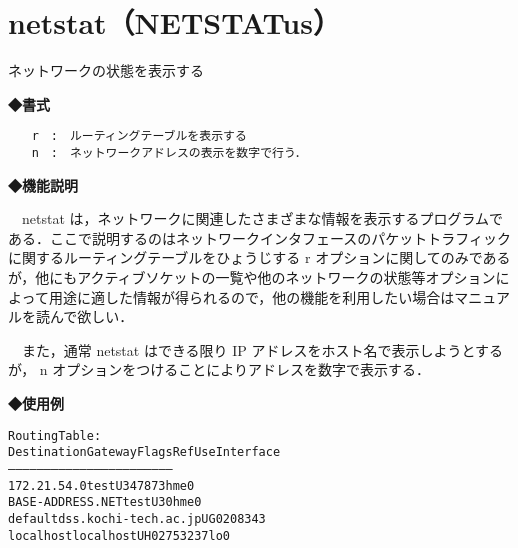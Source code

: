 \label{cmd:netstat}
\section{netstat（NETSTATus）}
ネットワークの状態を表示する\par

{\bf ◆書式}
\begin{center}
\begin{screen}
\begin{alltt}
 % netstat [-rn]
 　　r　:　ルーティングテーブルを表示する
 　　n　:　ネットワークアドレスの表示を数字で行う．
\end{alltt}
\end{screen}
\end{center}

{\bf ◆機能説明}

　netstat は，ネットワークに関連したさまざまな情報を表示するプログラムである．ここで説明するのはネットワークインタフェースのパケットトラフィックに関するルーティングテーブルをひょうじする r オプションに関してのみであるが，他にもアクティブソケットの一覧や他のネットワークの状態等オプションによって用途に適した情報が得られるので，他の機能を利用したい場合はマニュアルを読んで欲しい．\par
　また，通常 netstat はできる限り IP アドレスをホスト名で表示しようとするが， n オプションをつけることによりアドレスを数字で表示する．\par

{\bf ◆使用例}
\begin{center}
\begin{breakbox}
\begin{alltt}
 % \underline{netstat -r}  \keybox{Enter}
 Routing Table:
   Destination           Gateway           Flags  Ref   Use   Interface
 -------------------- -------------------- ----- ----- ------ ---------
 172.21.54.0          test                  U        3  47873  hme0
 BASE-ADDRESS.NET     test                  U        3      0  hme0
 default              dss.kochi-tech.ac.jp  UG       0 208343  
 localhost            localhost             UH       02753237  lo0
 %
\end{alltt}
\end{breakbox}
\end{center}
\clearpage
